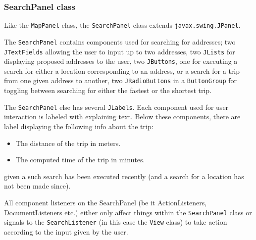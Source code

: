 \documentclass[a4paper,11pt]{article}
\begin{document}
\subsubsection{SearchPanel class}
Like the \texttt{MapPanel} class, the \texttt{SearchPanel} class extends \texttt{javax.swing.JPanel}.

The \texttt{SearchPanel} contains components used for searching for addresses; two \texttt{JTextFields} allowing the user to input up to two addresses, two \texttt{JLists} for displaying proposed addresses to the user, two \texttt{JButtons}, one for executing a search for either a location corresponding to an address, or a search for a trip from one given address to another, two \texttt{JRadioButtons} in a \texttt{ButtonGroup} for toggling between searching for either the fastest or the shortest trip.

The \texttt{SearchPanel} else has several \texttt{JLabels}. Each component used for user interaction is labeled with explaining text. Below these components, there are label displaying the following info about the trip:
\begin{itemize}
 \item The distance of the trip in meters.
 \item The computed time of the trip in minutes.
\end{itemize}
given a such search has been executed recently (and a search for a location has not been made since).

All component listeners on the SearchPanel (be it ActionListeners, DocumentListeners etc.) either only affect things within the \texttt{SearchPanel} class or signals to the \texttt{SearchListener} (in this case the \texttt{View} class) to take action according to the input given by the user.
\end{document}
